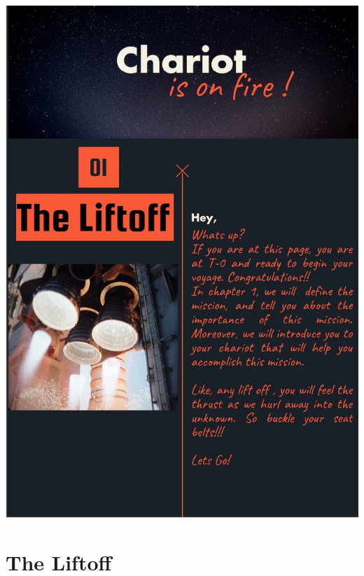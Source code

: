 \documentclass[12pt]{book}\usepackage{knitr}
\begin{document}
\tableofcontents
\cleardoublepage
\thispagestyle{empty}
\includegraphics[width = 17 cm]{./viz/ext/Liftoff.jpeg}

\newpage
\chapter{The Liftoff}



\end{document}
